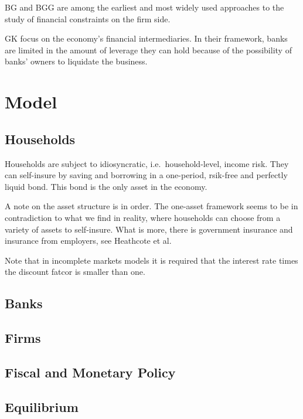 \documentclass[12pt]{article}
\numberwithin{equation}{section} %
\begin{document}
BG and BGG are among the earliest and most widely used approaches to the study of financial constraints on the firm side.

GK focus on the economy's financial intermediaries. In their framework, banks are limited in the amount of leverage they can hold because of the possibility of banks' owners to liquidate the business.

\section{Model}
\label{sec:model}

\subsection{Households}
\label{sec:model-hh}

Households are subject to idiosyncratic, i.e.~household-level, income risk. They can self-insure by saving and borrowing in a one-period, rsik-free and perfectly liquid bond. This bond is the only asset in the economy.

A note on the asset structure is in order. The one-asset framework seems to be in contradiction to what we find in reality, where households can choose from a variety of assets to self-insure. What is more, there is government insurance and insurance from employers, see Heathcote et al.

Note that in incomplete markets models it is required that the interest rate times the discount fatcor is smaller than one.

\subsection{Banks}
\label{sec:model-banks}

\subsection{Firms}
\label{sec:model-firms}

\subsection{Fiscal and Monetary Policy}
\label{sec:model-policy}

\subsection{Equilibrium}
\label{sec:model-eq}
\end{document}
